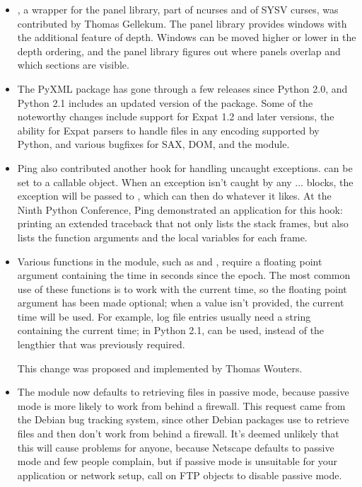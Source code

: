 \documentclass{howto}
\begin{document}
\begin{itemize}
\item {}, a wrapper for the panel library, part of
ncurses and of SYSV curses, was contributed by Thomas Gellekum.  The
panel library provides windows with the additional feature of depth.
Windows can be moved higher or lower in the depth ordering, and the
panel library figures out where panels overlap and which sections are
visible.

\item The PyXML package has gone through a few releases since Python
2.0, and Python 2.1 includes an updated version of the 
package.  Some of the noteworthy changes include support for Expat 1.2
and later versions, the ability for Expat parsers to handle files in
any encoding supported by Python, and various bugfixes for SAX, DOM,
and the  module.

\item Ping also contributed another hook for handling uncaught
exceptions.   can be set to a callable
object.  When an exception isn't caught by any
... blocks, the exception will be passed
to , which can then do whatever it likes.  At
the Ninth Python Conference, Ping demonstrated an application for this
hook: printing an extended traceback that not only lists the stack
frames, but also lists the function arguments and the local variables
for each frame.  

\item Various functions in the  module, such as
 and , require a floating
point argument containing the time in seconds since the epoch.  The
most common use of these functions is to work with the current time,
so the floating point argument has been made optional; when a value
isn't provided, the current time will be used.  For example, log file
entries usually need a string containing the current time; in Python
2.1,  can be used, instead of the lengthier
 that was previously
required.
 
This change was proposed and implemented by Thomas Wouters.

\item The  module now defaults to retrieving files in
passive mode, because passive mode is more likely to work from behind
a firewall.  This request came from the Debian bug tracking system,
since other Debian packages use  to retrieve files and
then don't work from behind a firewall.  It's deemed unlikely that
this will cause problems for anyone, because Netscape defaults to
passive mode and few people complain, but if passive mode is
unsuitable for your application or network setup, call
 on FTP objects to disable passive mode.


\end{itemize}
\end{document}
